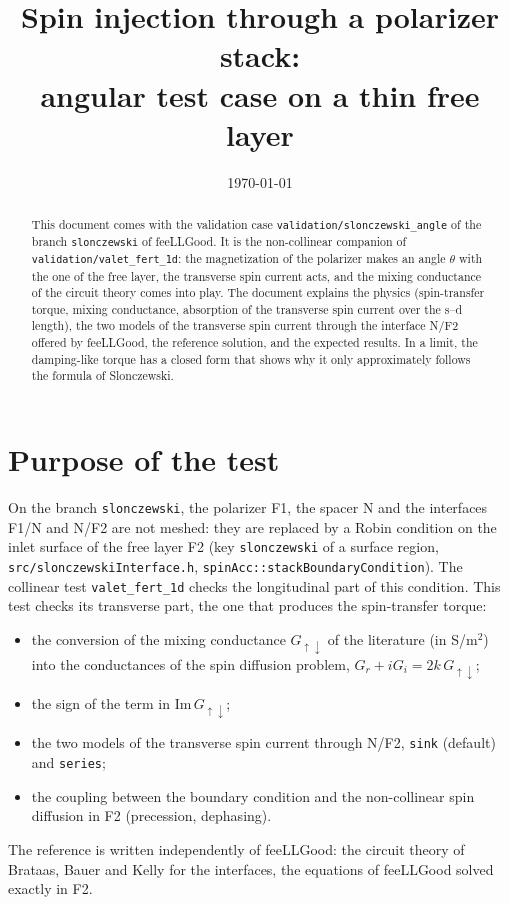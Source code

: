\documentclass[11pt,a4paper]{article}
\title{Spin injection through a polarizer stack:\\
  angular test case on a thin free layer}
\author{}
\date{\today}
\begin{document}
\maketitle

\begin{abstract}
  This document comes with the validation case
  \texttt{validation/slonczewski\_angle} of the branch \texttt{slonczewski}
  of feeLLGood. It is the non-collinear companion of
  \texttt{validation/valet\_fert\_1d}: the magnetization of the polarizer
  makes an angle $\theta$ with the one of the free layer, the transverse
  spin current acts, and the mixing conductance of the circuit theory
  comes into play. The document explains the physics (spin-transfer
  torque, mixing conductance, absorption of the transverse spin current
  over the s--d length), the two models of the transverse spin current
  through the interface N/F2 offered by feeLLGood, the reference solution,
  and the expected results. In a limit, the damping-like torque has a
  closed form that shows why it only approximately follows the formula of
  Slonczewski.
\end{abstract}

\tableofcontents

\section{Purpose of the test}

On the branch \texttt{slonczewski}, the polarizer F1, the spacer N and the
interfaces F1/N and N/F2 are not meshed: they are replaced by a Robin
condition on the inlet surface of the free layer F2 (key
\texttt{slonczewski} of a surface region, \texttt{src/slonczewskiInterface.h},
\texttt{spinAcc::stackBoundaryCondition}). The collinear test
\texttt{valet\_fert\_1d} checks the longitudinal part of this condition.
This test checks its transverse part, the one that produces the
spin-transfer torque:
\begin{itemize}
  \item the conversion of the mixing conductance $G_{\uparrow\downarrow}$
    of the literature (in S/m$^2$) into the conductances of the spin
    diffusion problem, $G_r + iG_i = 2k\,G_{\uparrow\downarrow}$;
  \item the sign of the term in $\mathrm{Im}\,G_{\uparrow\downarrow}$;
  \item the two models of the transverse spin current through N/F2,
    \texttt{sink} (default) and \texttt{series};
  \item the coupling between the boundary condition and the
    non-collinear spin diffusion in F2 (precession, dephasing).
\end{itemize}
The reference is written independently of feeLLGood: the circuit theory
of Brataas, Bauer and Kelly for the interfaces, the equations of
feeLLGood solved exactly in F2.
\end{document}
